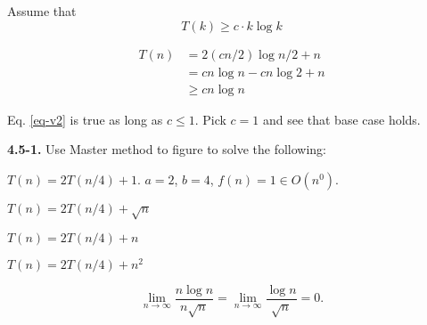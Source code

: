 \documentclass[11pt,a4paper]{article}
\renewcommand{\leq}{\leqslant}
\renewcommand{\geq}{\geqslant}
\begin{document}
Assume that
\begin{equation}
\label{eq-third}
T(k) \geq c \cdot k \log{k}
\end{equation}

\begin{equation}
\label{eq-v2}
\begin{split}
	T(n)&= 2 (cn/2) \log{n/2} + n \\
		&= cn\log{n} - cn\log{2} + n \\
		& \geq cn\log{n}
\end{split}
\end{equation}

Eq. \ref{eq-v2} is true as long as $c \leq 1$. Pick $c = 1$ and see that base case holds.


\noindent\textbf{4.5-1.} Use Master method to figure to solve the following:

\begin{description}
	\item $T(n) = 2T(n/4) + 1$. $a = 2$, $b=4$, $f(n) = 1 \in O(n^0)$.

	\item $T(n) = 2T(n/4) + \sqrt{n}$
	\item $T(n) = 2T(n/4) + n$
	\item $T(n) = 2T(n/4) + n^2$
\end{description}

\[
\lim_{n\to\infty} \frac{n\log{n}}{n \sqrt{n}} = \lim_{n\to\infty} \frac{\log{n}}{\sqrt{n}} = 0.
\]
\end{document}
